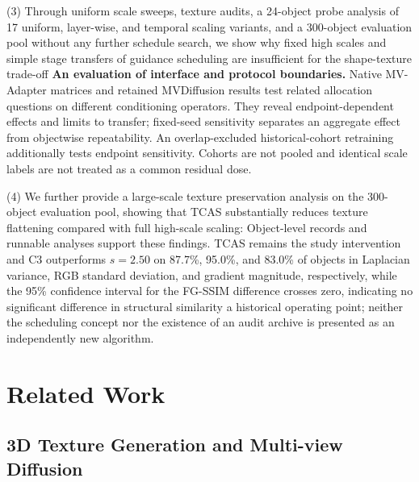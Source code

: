 \documentclass[times,twocolumn,final]{elsarticle}
\providecommand{\DIFadd}[1]{{\protect\color{blue} \sf #1}} %
\providecommand{\DIFdel}[1]{{\protect\color{red} \scriptsize #1}} %
\providecommand{\DIFaddbegin}{} %
\providecommand{\DIFaddend}{} %
\providecommand{\DIFdelbegin}{} %
\providecommand{\DIFdelend}{} %
\begin{document}
(3) \DIFdelbegin \DIFdel{Through uniform scale sweeps, texture audits, a 24-object probe analysis of 17 uniform, layer-wise, and temporal scaling variants, and a 300-object evaluation pool without any further schedule search, we show why fixed high scales and simple stage transfers of guidance scheduling are insufficient for the shape-texture trade-off}\DIFdelend \DIFaddbegin \DIFadd{\textbf{An evaluation of interface and protocol boundaries.} Native MV-Adapter matrices and retained MVDiffusion results test related allocation questions on different conditioning operators. They reveal endpoint-dependent effects and limits to transfer; fixed-seed sensitivity separates an aggregate effect from objectwise repeatability. An overlap-excluded historical-cohort retraining additionally tests endpoint sensitivity. Cohorts are not pooled and identical scale labels are not treated as a common residual dose}\DIFaddend .

\DIFdelbegin \DIFdel{(4) We further provide a large-scale texture preservation analysis on the 300-object evaluation pool, showing that TCAS substantially reduces texture flattening compared with full high-scale scaling: }\DIFdelend \DIFaddbegin \DIFadd{Object-level records and runnable analyses support these findings. TCAS remains the study intervention and }\DIFaddend C3 \DIFdelbegin \DIFdel{outperforms $s = 2.50$ on 87.7\%, 95.0\%, and 83.0\% of objects in Laplacian variance, RGB standard deviation, and gradient magnitude, respectively, while the 95\% confidence interval for the FG-SSIM difference crosses zero, indicating no significant difference in structural similarity}\DIFdelend \DIFaddbegin \DIFadd{a historical operating point; neither the scheduling concept nor the existence of an audit archive is presented as an independently new algorithm}\DIFaddend .

\section{Related Work}
\label{sec:related}

\subsection{3D Texture Generation and Multi-view Diffusion}
\label{subsec:3dtex}
\end{document}
